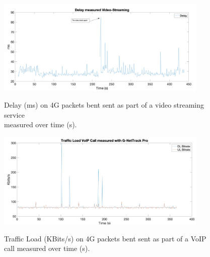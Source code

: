 \begin{itemize}
    \begin{figure}[!h]
        \includegraphics[width=0.9\textwidth]{images/chapter_3_design/delay_plotted_against_time_from_study}
        \centering~\caption{Delay (ms) on 4G packets bent sent as part of a video streaming service \\
        measured over time (s)\cite{study_on_quality_of_service_in_4G_and_5G_networks}.
        }\label{fig:chapter_3_design-delay_plotted_against_time_from_study}
    \end{figure}
    \begin{figure}[!h]
        \includegraphics[width=0.9\textwidth]{images/chapter_3_design/traffic_load_plotted_against_time_from_study}
        \centering~\caption{Traffic Load (KBits/s) on 4G packets bent sent as part of a VoIP call measured over
        time (s)\cite{study_on_quality_of_service_in_4G_and_5G_networks}.
        }\label{fig:chapter_3_design-traffic_load_plotted_against_time_from_study}
    \end{figure}


\end{itemize}
